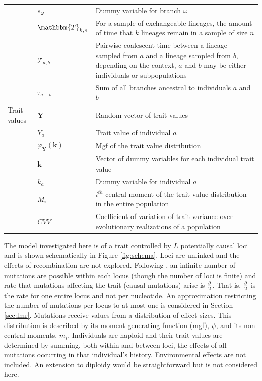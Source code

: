 \begin{table}
\begin{tabular}{l l l}
                                         & $s_\omega$ & Dummy variable for branch $\omega$ \\
                                         & $\mathbbm{T}_{k,n}$ & \multicolumn{1}{p{10cm}}{For a sample of exchangeable lineages, the amount of time that $k$ lineages remain in a sample of size $n$}\\
                                         & $\mathcal{T}_{a,b}$ & \multicolumn{1}{p{10cm}}{Pairwise coalescent time between a lineage sampled from $a$ and a lineage sampled from $b$, depending on the context, $a$ and $b$ may be either individuals or subpopulations}\\
                                         & $\tau_{a+b}$ & Sum of all branches ancestral to individuals $a$ and $b$\\
    Trait values & $\mathbf{Y}$ & Random vector of trait values \\
                                         & $Y_a$ & Trait value of individual $a$\\
                                         & $\varphi_{\mathbf{Y}}(\mathbf{k})$ & Mgf of the trait value distribution \\
                                         & $\mathbf{k}$ & \multicolumn{1}{p{10cm}}{Vector of dummy variables for each individual trait value}\\
                                         & $k_a$ & Dummy variable for individual $a$\\
                                         & $M_i$ & \multicolumn{1}{p{10cm}}{$i^{th}$ central moment of the trait value distribution in the entire population}\\
                                         & $CVV$ & \multicolumn{1}{p{10cm}}{Coefficient of variation of trait variance over evolutionary realizations of a population}\\
    \hline
  \end{tabular}
  \label{notation}
\end{table}

The model investigated here is of a trait controlled by $L$ potentially causal
loci and is shown schematically in Figure \ref{fig:schema}. Loci are unlinked
and the effects of recombination are not explored. Following \citet{Kimura1969},
an infinite number of mutations are possible within each locus (though the
number of loci is finite) and rate that mutations affecting the trait (causal
mutations) arise is $\frac{\theta}{2}$. That is, $\frac{\theta}{2}$ is the rate for one entire locus and not
per nucleotide. An approximation restricting the number of mutations per locus
to at most one is considered in Section \ref{sec:lmr}. Mutations receive values
from a distribution of effect sizes. This distribution is described by its
moment generating function (mgf), $\psi$, and its non-central moments, $m_i$.
Individuals are haploid and their trait values are determined by summing, both
within and between loci, the effects of all mutations occurring in that
individual's history. Environmental effects are not included. An extension to
diploidy would be straightforward but is not considered here.

